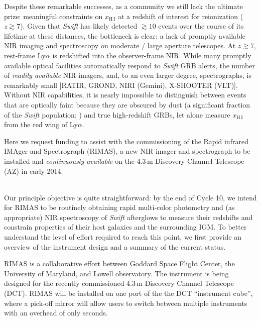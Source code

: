 \documentclass[letterpaper,11pt]{article}
\begin{document}
Despite these remarkable successes, as a community we still lack the ultimate
prize: meaningful constraints on $x_{\mathrm{H\,I}}$ at a redshift of interest
for reionization ($z \gtrsim 7$).  Given that \textit{Swift} has likely detected
$\gtrsim 10$ events over the course of its lifetime at these distances, the
bottleneck is clear: a lack of promptly available NIR imaging and spectroscopy 
on moderate / large aperture telescopes.  At $z \gtrsim 7$, rest-frame Ly$\alpha$
is redshifted into the observer-frame NIR.  While many promptly available 
optical facilities automatically respond to \textit{Swift} GRB alerts, the number
of \textit{readily available} NIR imagers, and, to an even larger degree,
spectrographs, is remarkably small [RATIR, GROND, NIRI (Gemini), X-SHOOTER (VLT)].
Without NIR capabilities, it is nearly impossible to distinguish between events
that are optically faint because they are obscured by dust (a significant fraction
of the \textit{Swift} population; \cite{ckh+09,pcb+09,gkk+11}) and true
high-redshift GRBs, let alone measure $x_{\mathrm{H\,I}}$ from the red wing of
Ly$\alpha$.

Here we request funding to assist with the commissioning of the Rapid infrared
IMAger and Spectrograph (RIMAS), a new NIR imager and spectrograph to be installed and 
\textit{continuously available} on the 4.3\,m Discovery Channel Telescope (AZ) in early 
2014.

\smallskip

\smallskip\\
Our principle objective is quite straightforward: by the end of Cycle 10, we intend
for RIMAS to be routinely obtaining rapid multi-color photometry and (as appropriate) 
NIR spectroscopy of \textit{Swift} afterglows to measure their redshifts and constrain 
properties of their host galaxies and the surrounding IGM.  To better understand the 
level of effort required to reach this point, we first provide an overview of the 
instrument design and a summary of the current status.

\smallskip

RIMAS is a collaborative effort between Goddard Space Flight Center, the University of
Maryland, and Lowell observatory.  The instrument is being designed for the recently
commissioned 4.3\,m Discovery Channel Telescope (DCT).  RIMAS will be installed on one 
port of the the DCT ``instrument cube'', where a pick-off mirror will allow users to
switch between multiple instruments with an overhead of only seconds.
\end{document}
